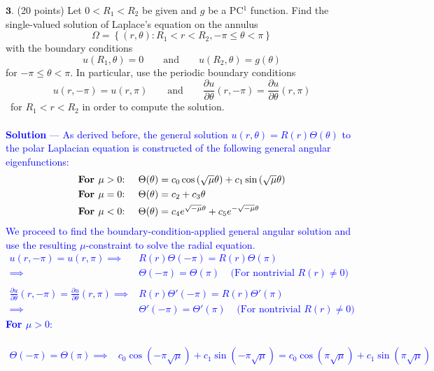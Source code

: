 \documentclass[12pt]{article}
\begin{document}
\noindent $\textbf{3}$. (20 points) Let $0 < R_1 < R_2$ be given and $g$ be a PC$^1$ function. Find the single-valued solution of Laplace's equation on the annulus
$$ \Omega = \left \{ (r,\theta) : R_1 < r < R_2, -\pi \leq \theta < \pi \right \}$$
with the boundary conditions
$$u(R_1, \theta) = 0 \qquad \mathrm{and} \qquad u(R_2, \theta) = g(\theta)$$
for $-\pi \leq \theta < \pi$.
In particular, use the periodic boundary conditions
$$u(r, -\pi) = u(r, \pi) \qquad \mathrm{and} \qquad \frac{\partial u}{\partial \theta}(r, -\pi) = \frac{\partial u}{\partial \theta}(r, \pi)$$\
for $R_1 < r < R_2$
in order to compute the solution. \\ \\
\textcolor{blue}{\textbf{Solution} — 
As derived before, the general solution $u(r,\theta) = R(r) \Theta(\theta)$ to the polar Laplacian equation is constructed of the following general angular eigenfunctions:
\begin{align*}
\text{\textbf{For $\mu > 0$}:} \;\;\;\;\; & \Theta(\theta) = c_0 \cos \left( \sqrt{\mu} \theta \right) + c_1 \sin \left( \sqrt{\mu} \theta \right) \\
\text{\textbf{For $\mu = 0$}:} \;\;\;\;\; & \Theta(\theta) = c_2 + c_3 \theta \\
\text{\textbf{For $\mu < 0$}:} \;\;\;\;\; & \Theta(\theta) = c_4 e^{\sqrt{-\mu} \theta} +c_5 e^{-\sqrt{-\mu} \theta} 
\end{align*}
We proceed to find the boundary-condition-applied general angular solution and use the resulting $\mu$-constraint to solve the radial equation. \\
\begin{align*}
u(r, -\pi) = u(r, \pi) \implies& R(r) \Theta(-\pi) = R(r) \Theta(\pi) \\
\implies& \Theta(-\pi) = \Theta(\pi) \;\;\;\; \text{(For nontrivial $R(r) \neq 0$)} \\ \\
\frac{\partial u}{\partial \theta}(r, -\pi) = \frac{\partial u}{\partial \theta}(r, \pi) \implies& R(r) \Theta'(-\pi) = R(r) \Theta'(\pi) \\
\implies& \Theta'(-\pi) = \Theta'(\pi) \;\;\;\; \text{(For nontrivial $R(r) \neq 0$)}
\end{align*}
\textbf{For $\mu > 0$}:  \\ \\
\begin{align*}
\Theta(-\pi) = \Theta(\pi) \implies& c_0 \cos \left( -\pi \sqrt{\mu} \right) + c_1 \sin \left( -\pi \sqrt{\mu} \right) = c_0 \cos \left( \pi \sqrt{\mu}  \right) + c_1 \sin \left( \pi \sqrt{\mu}  \right) \\

\end{align*}}
\end{document}
